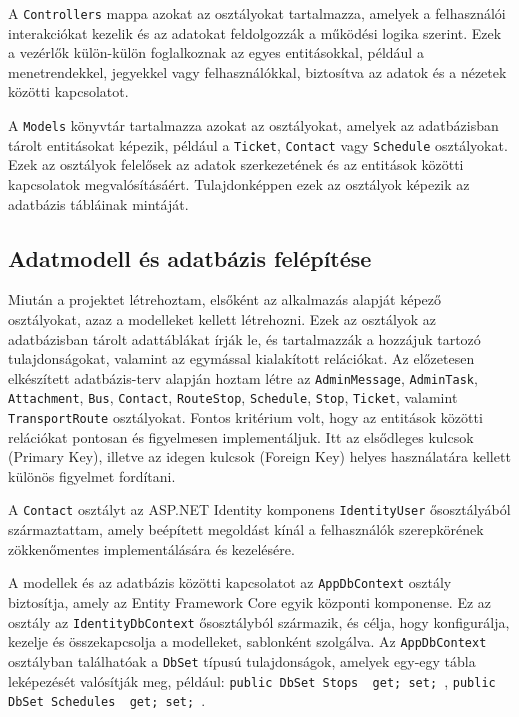 A \texttt{Controllers} mappa azokat az osztályokat tartalmazza, amelyek a felhasználói interakciókat kezelik és az adatokat feldolgozzák a működési logika szerint. Ezek a vezérlők külön-külön foglalkoznak az egyes entitásokkal, például a menetrendekkel, jegyekkel vagy felhasználókkal, biztosítva az adatok és a nézetek közötti kapcsolatot.

A \texttt{Models} könyvtár tartalmazza azokat az osztályokat, amelyek az adatbázisban tárolt entitásokat képezik, például a \texttt{Ticket}, \texttt{Contact} vagy \texttt{Schedule} osztályokat. Ezek az osztályok felelősek az adatok szerkezetének és az entitások közötti kapcsolatok megvalósításáért. Tulajdonképpen ezek az osztályok képezik az adatbázis tábláinak mintáját.


\subsection{Adatmodell és adatbázis felépítése}

Miután a projektet létrehoztam, elsőként az alkalmazás alapját képező osztályokat, azaz a modelleket kellett létrehozni. Ezek az osztályok az adatbázisban tárolt adattáblákat írják le, és tartalmazzák a hozzájuk tartozó tulajdonságokat, valamint az egymással kialakított relációkat. Az előzetesen elkészített adatbázis-terv alapján hoztam létre az \texttt{AdminMessage}, \texttt{AdminTask}, \texttt{Attachment}, \texttt{Bus}, \texttt{Contact}, \texttt{RouteStop}, \texttt{Schedule}, \texttt{Stop}, \texttt{Ticket}, valamint \texttt{TransportRoute} osztályokat. Fontos kritérium volt, hogy az entitások közötti relációkat pontosan és figyelmesen implementáljuk. Itt az elsődleges kulcsok (Primary Key), illetve az idegen kulcsok (Foreign Key) helyes használatára kellett különös figyelmet fordítani.

A \texttt{Contact} osztályt az ASP.NET Identity komponens \texttt{IdentityUser} ősosztályából származtattam, amely beépített megoldást kínál a felhasználók szerepkörének zökkenőmentes implementálására és kezelésére.

A modellek és az adatbázis közötti kapcsolatot az \texttt{AppDbContext} osztály biztosítja, amely az Entity Framework Core egyik központi komponense. Ez az osztály az \texttt{IdentityDbContext} ősosztályból származik, és célja, hogy konfigurálja, kezelje és összekapcsolja a modelleket, sablonként szolgálva. Az \texttt{AppDbContext} osztályban találhatóak a \texttt{DbSet} típusú tulajdonságok, amelyek egy-egy tábla leképezését valósítják meg, például: \texttt{public DbSet Stops { get; set; }}, \texttt{public DbSet Schedules { get; set; }}.

